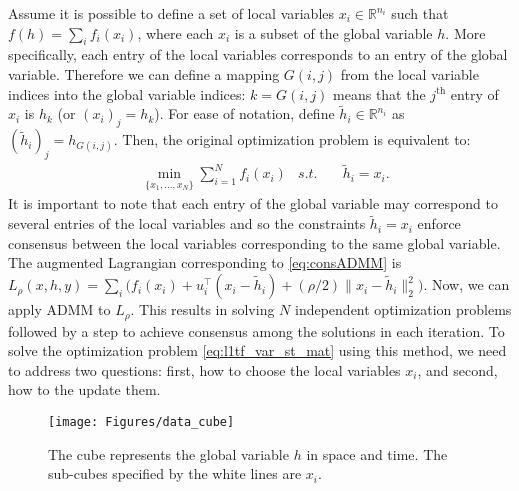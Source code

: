 \documentclass[letterpaper]{article} %
\DeclareMathOperator*{\argmin}{argmin}
\newcommand{\attn}[1]{\textcolor{red}{TODO: #1}}
\newcommand{\norm}[1]{\left\lVert #1 \right\rVert}
\begin{document}
Assume it is possible to define a set of local variables
$x_i \in \mathbb{R}^{n_i}$ such that $f(h)=\sum_i f_i(x_i)$, where
each $x_i$ is a subset of the global variable $h$. More specifically,
each entry of the local variables corresponds to an entry of the
global variable. Therefore we can define a mapping $G(i,j)$
from the local variable indices into the global variable indices:
$k=G(i,j)$ means that the $j^\text{th}$ entry of $x_i$ is
$h_k$ (or $(x_i)_j=h_k$). For ease of notation, define $\tilde{h}_i
\in \mathbb{R}^{n_i}$ as $(\tilde{h}_i)_j=h_{G(i,j)}$. Then,
the original optimization problem is equivalent to:  
\begin{equation}
\begin{aligned}
&\min_{\{x_1,...,x_N  \}} \sum_{i=1}^N f_i(x_i) &
s.t. &\quad \tilde{h}_i=x_i.
\end{aligned}
\label{eq:consADMM}
\end{equation}
It is important to note that each entry of the global variable may
correspond to several entries of the local variables and so the
constraints $\tilde{h}_i=x_i$ enforce consensus between the local
variables corresponding to the same global variable.  
The augmented Lagrangian corresponding to 
\eqref{eq:consADMM} is $L_\rho(x,h,y)=\sum_i
\big(f_i(x_i)+u_i^\top(x_i-\tilde{h}_i) + (\rho/2) \lVert
x_i-\tilde{h}_i \lVert_2^2 \big)$. Now, we can apply ADMM to
$L_\rho$. This results in solving $N$ independent optimization
problems followed by a step to achieve consensus among the solutions
in each iteration. 
To solve the optimization problem \eqref{eq:l1tf_var_st_mat} using
this method, we need to address two 
questions: first, how to choose the 
local variables $x_i$, and second, how to the update them.
\begin{figure}[tb]
  \centering
  \texttt{[image: Figures/data\_cube]}
  \caption{The cube represents the global variable $h$ in space and
    time. The sub-cubes specified by the white lines are
    $x_i$.}
  \label{fig:data_cube}
\end{figure} 
\end{document}
